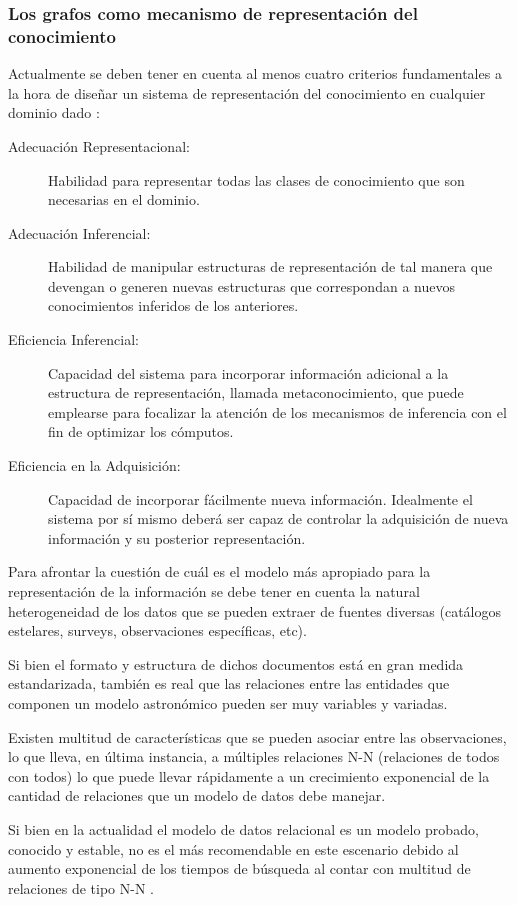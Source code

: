 \documentclass[
	11pt,oneside,a4paper,
	fleqn,
	article
]{memoir}
\begin{document}
\subsubsection{Los grafos como mecanismo de representación del conocimiento}

Actualmente se deben tener en cuenta al menos cuatro criterios fundamentales a la hora de diseñar un sistema de representación del conocimiento en cualquier dominio dado \cite{van2008handbook}:

\begin{description}
	\item [Adecuación Representacional:] Habilidad para representar todas las clases de conocimiento que son necesarias en el dominio.
	\item [Adecuación Inferencial:] Habilidad de manipular estructuras de representación de tal manera que devengan o generen nuevas estructuras que correspondan a nuevos conocimientos inferidos de los anteriores.
	\item [Eficiencia Inferencial:] Capacidad del sistema para incorporar información adicional a la estructura de representación, llamada metaconocimiento, que puede emplearse para focalizar la atención de los mecanismos de inferencia con el fin de optimizar los cómputos.
	\item [Eficiencia en la Adquisición:] Capacidad de incorporar fácilmente nueva información. Idealmente el sistema por sí mismo deberá ser capaz de controlar la adquisición de nueva información y su posterior representación.
\end{description}

Para afrontar la cuestión de cuál es el modelo más apropiado para la representación de la información se debe tener en cuenta la natural heterogeneidad de los datos que se pueden extraer de fuentes diversas (catálogos estelares, surveys, observaciones específicas, etc). 

Si bien el formato y estructura de dichos documentos está en gran medida estandarizada, también es real que las relaciones entre las entidades que componen un modelo astronómico pueden ser muy variables y variadas. 

Existen multitud de características que se pueden asociar entre las observaciones, lo que lleva, en última instancia, a múltiples relaciones N-N (relaciones de todos con todos) lo que puede llevar rápidamente a un crecimiento exponencial de la cantidad de relaciones que un modelo de datos debe manejar.

Si bien en la actualidad el modelo de datos relacional es un modelo probado, conocido y estable, no es el más recomendable en este escenario debido al aumento exponencial de los tiempos de búsqueda al contar con multitud de relaciones de tipo N-N \cite{kunii1987dbms}. 
\end{document}
